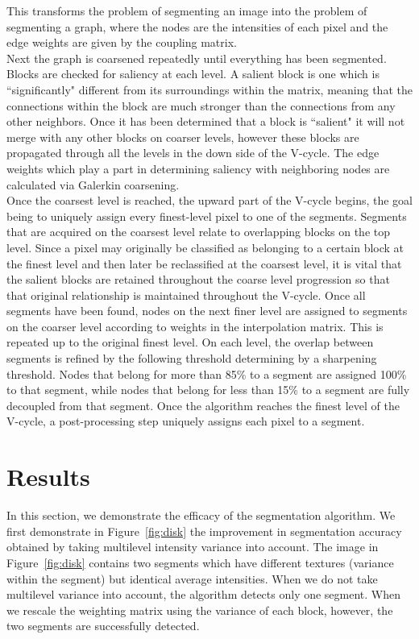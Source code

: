 \documentclass[12pt]{article}%
\begin{document}
\noindent This transforms the problem of segmenting an image into the problem of segmenting a graph, where the nodes are the intensities of each pixel and the edge weights are given by the coupling matrix.
\vspace{5mm} \\
Next the graph is coarsened repeatedly until everything has been segmented. Blocks are checked for saliency at each level.  A salient block is one which is ``significantly" different from its surroundings within the matrix, meaning that the connections within the block are much stronger than the connections from any other neighbors. Once it has been determined that a block is ``salient" it will not merge with any other blocks on coarser levels, however these blocks are propagated through all the levels in the down side of the V-cycle.  The edge weights which play a part in determining saliency with neighboring nodes are calculated via Galerkin coarsening.  %
\vspace{5mm} \\
Once the coarsest level is reached, the upward part of the V-cycle begins, the goal being to uniquely assign every finest-level pixel to one of the segments.  Segments that are acquired on the coarsest level relate to overlapping blocks on the top level.  Since a pixel may originally be classified as belonging to a certain block at the finest level and then later be reclassified at the coarsest level, it is vital that the salient blocks are retained throughout the coarse level progression so that that original relationship is maintained throughout the V-cycle. Once all segments have been found, nodes on the next finer level are assigned to segments on the coarser level according to weights in the interpolation matrix. This is repeated up to the original finest level. On each level, the overlap between segments is refined by the following threshold determining by a sharpening threshold.  Nodes that belong for more than 85\% to a segment are assigned 100\% to that segment, while nodes that belong for less than 15\% to a segment are fully decoupled from that segment. Once the algorithm reaches the finest level of the V-cycle, a post-processing step uniquely assigns each pixel to a segment.

\section{Results}

In this section, we demonstrate the efficacy of the segmentation algorithm. We first demonstrate in Figure~\ref{fig:disk} the improvement in segmentation accuracy obtained by taking multilevel intensity variance into account. The image in Figure~\ref{fig:disk} contains two segments which have different textures (variance within the segment) but identical average intensities. When we do not take multilevel variance into account, the algorithm detects only one segment. When we rescale the weighting matrix using the variance of each block, however, the two segments are successfully detected.\\
\end{document}
